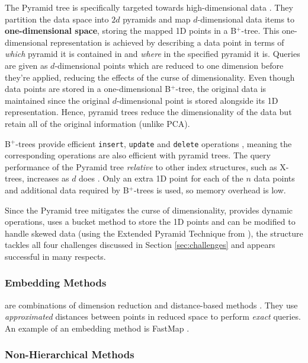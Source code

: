 The Pyramid tree is specifically targeted towards high-dimensional data \cite{pyramid-tree}. They partition the data space into $2d$ pyramids and map $d$-dimensional data items to \textbf{one-dimensional space}, storing the mapped 1D points in a B${}^{+}$-tree. This one-dimensional representation is achieved by describing a data point in terms of \textit{which} pyramid it is contained in and \textit{where} in the specified pyramid it is. Queries are given as $d$-dimensional points which are reduced to one dimension before they're applied, reducing the effects of the curse of dimensionality. Even though data points are stored in a one-dimensional B${}^{+}$-tree, the original data is maintained since the original $d$-dimensional point is stored alongside its 1D representation. Hence, pyramid trees reduce the dimensionality of the data but retain all of the original information (unlike PCA).

B${}^{+}$-trees provide efficient \texttt{insert}, \texttt{update} and \texttt{delete} operations \cite{ubiquitous-btree}, meaning the corresponding operations are also efficient with pyramid trees. The query performance of the Pyramid tree \textit{relative} to other index structures, such as X-trees, increases as $d$ does \cite{pyramid-tree}. Only an extra 1D point for each of the $n$ data points and additional data required by B${}^{+}$-trees is used, so memory overhead is low.

Since the Pyramid tree mitigates the curse of dimensionality, provides dynamic operations, uses a bucket method to store the 1D points and can be modified to handle skewed data (using the Extended Pyramid Technique from \cite{pyramid-tree}), the structure tackles all four challenges discussed in Section \ref{sec:challenges} and appears successful in many respects.

\subsubsection{Embedding Methods} are combinations of dimension reduction and distance-based methods \cite{md-structures-samet}. They use \textit{approximated} distances between points in reduced space to perform \textit{exact} queries. An example of an embedding method is FastMap \cite{fast-map}.

\subsubsection{Non-Hierarchical Methods}

